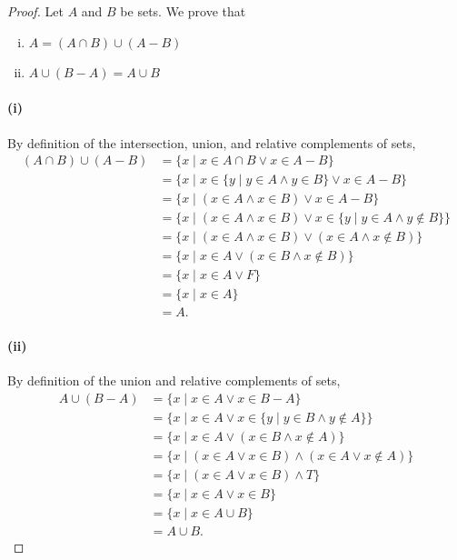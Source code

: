 \documentclass{report}
\begin{document}
  \begin{proof}
    Let $A$ and $B$ be sets.
    We prove that
      \begin{enumerate}[(i)]
        \item $A = (A \cap B) \cup (A - B)$
        \item $A \cup (B - A) = A \cup B$
      \end{enumerate}

    \paragraph{(i)}%

      By definition of the intersection, union, and relative complements of
        sets,
        \begin{align*}
          (A \cap B) \cup (A - B)
            & = \{ x \mid x \in A \cap B \lor x \in A - B \} \\
            & = \{ x \mid x \in \{ y \mid y \in A \land y \in B \} \lor
              x \in A - B \} \\
            & = \{ x \mid (x \in A \land x \in B) \lor x \in A - B \} \\
            & = \{ x \mid (x \in A \land x \in B) \lor
              x \in \{ y \mid y \in A \land y \not\in B \} \} \\
            & = \{ x \mid (x \in A \land x \in B) \lor
              (x \in A \land x \not\in B) \} \\
            & = \{ x \mid x \in A \lor (x \in B \land x \not\in B) \} \\
            & = \{ x \mid x \in A \lor F \} \\
            & = \{ x \mid x \in A \} \\
            & = A.
        \end{align*}

    \paragraph{(ii)}%

      By definition of the union and relative complements of sets,
        \begin{align*}
          A \cup (B - A)
            & = \{ x \mid x \in A \lor x \in B - A \} \\
            & = \{ x \mid x \in A \lor
              x \in \{ y \mid y \in B \land y \not\in A \} \} \\
            & = \{ x \mid x \in A \lor (x \in B \land x \not\in A) \} \\
            & = \{ x \mid (x \in A \lor x \in B) \land
              (x \in A \lor x \not\in A) \} \\
            & = \{ x \mid (x \in A \lor x \in B) \land T \} \\
            & = \{ x \mid x \in A \lor x \in B \} \\
            & = \{ x \mid x \in A \cup B \} \\
            & = A \cup B.
        \end{align*}

  \end{proof}
\end{document}
